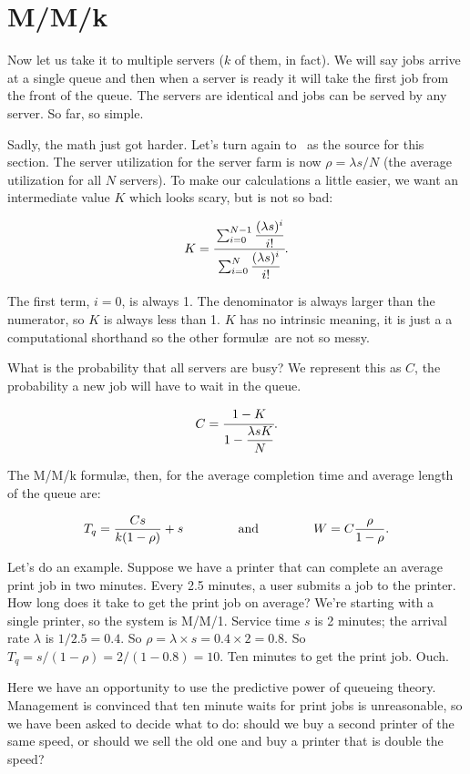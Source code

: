 \documentclass[a4paper]{report}
\begin{document}
\section*{M/M/k}

Now let us take it to multiple servers ($k$ of them, in fact). We will say jobs arrive at a single queue and then when a server is ready it will take the first job from the front of the queue. The servers are identical and jobs can be served by any server. So far, so simple.

Sadly, the math just got harder. Let's turn again to~\cite{williams-q} as the source for this section. The server utilization for the server farm is now $\rho = \lambda s / N$ (the average utilization for all $N$ servers). To make our calculations a little easier, we want an intermediate value $K$ which looks scary, but is not so bad:

\[ K = \cfrac{\sum_{i=0}^{N-1}\dfrac{(\lambda s)^{i}}{i!}}{{\sum_{i=0}^{N}\dfrac{(\lambda s)^{i}}{i!}}}.
\]

The first term, $i = 0$, is always 1. The denominator is always larger than the numerator, so $K$ is always less than 1. $K$ has no intrinsic meaning, it is just a a computational shorthand so the other formul\ae\  are not so messy.

What is the probability that all servers are busy? We represent this as $C$, the probability a new job will have to wait in the queue.

\[C = \cfrac{1 - K}{1 - \dfrac{\lambda s K}{N}}.\]

The M/M/k formul\ae, then, for the average completion time and average length of the queue are:

\[
  T_{q} = \dfrac{C s}{k(1 - \rho)} + s \mbox{ \qquad\qquad and \qquad\qquad } W = C \dfrac{\rho}{1 - \rho}.
\]

Let's do an example. Suppose we have a printer that can complete an average print job in two minutes. Every 2.5 minutes, a user submits a job to the printer. How long does it take to get the print job on average? We're starting with a single printer, so the system is M/M/1. Service time $s$ is 2 minutes; the arrival rate $\lambda$ is $1/2.5 = 0.4$. So $\rho = \lambda \times s = 0.4 \times 2 = 0.8$. So $T_{q} = s / (1 - \rho ) = 2 / (1 -0.8 ) = 10$. Ten minutes to get the print job. Ouch.

Here we have an opportunity to use the predictive power of queueing theory. Management is convinced that ten minute waits for print jobs is unreasonable, so we have been asked to decide what to do: should we buy a second printer of the same speed, or should we sell the old one and buy a printer that is double the speed?
\end{document}
